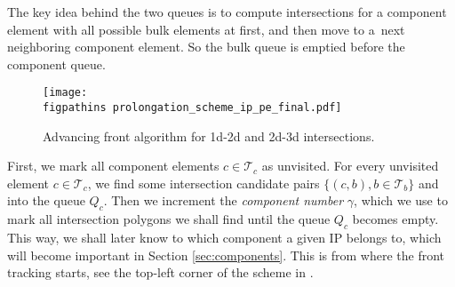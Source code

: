 The key idea behind the two queues is to compute intersections for a component element with all possible bulk elements at first,
and then move to a~next neighboring component element. So the bulk queue is emptied before the component queue.
%   
%             
%   

%
\begin{figure}[!htb]
  \centering    
    \texttt{[image: \\figpathins prolongation\_scheme\_ip\_pe\_final.pdf]}
  \caption{Advancing front algorithm for 1d-2d and 2d-3d intersections.}
  \label{fig:prolongation}
\end{figure}

First, we mark all component elements $c\in\mathcal T_c$ as unvisited. 
For every unvisited element $c\in \mathcal T_c$, 
we find some intersection candidate pairs $\{(c,b), b\in\mathcal T_b\}$ and
into the queue $Q_c$.
Then we increment the \emph{component number} $\gamma$, which we use to 
mark all intersection polygons we shall find until the queue $Q_c$ becomes empty.
This way, we shall later know to which component a given IP belongs to, 
which will become important in Section \ref{sec:components}.
This is from where the front tracking starts, see the top-left corner of the scheme in 
.

